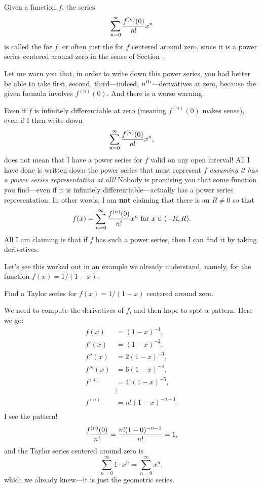 \begin{definition}\label{defn:maclaurin-series}
Given a function $f$, the series
$$\sum_{n=0}^\infty {f^{(n)}(0)\over n!}x^n$$
is called the  for $f$, or often just the
 for $f$ centered around zero, since it is a
power series centered around zero in the sense of
Section~.
\end{definition}
Let me warn you that, in order to write down this power series, you
had better be able to take first, second, third---indeed,
$n^{\mbox{\scriptsize th}}$---derivatives at zero, because the given formula involves
$f^{(n)}(0)$.  And there is a worse warning.
\begin{warning}
  Even if $f$ is infinitely differentiable at zero (meaning $f^{(n)}(0)$ makes sense), even if I then write down
  $$
  \sum_{n=0}^\infty {f^{(n)}(0)\over n!}x^n,
  $$
  does not mean that I have a power series for $f$ valid on any open
  interval!  All I have done is written down the power series that
  must represent $f$ \textit{assuming it has a power series
    representation at all!}  Nobody is promising you that some
  function you find---even if it is infinitely
  differentiable---actually has a power series representation.  In
  other words, I am \textbf{not} claiming that there is an $R \neq 0$
  so that
  $$
  f(x) = \sum_{n=0}^\infty {f^{(n)}(0)\over n!}x^n \mbox{ for $x \in (-R,R)$}.
  $$
  All I am claiming is that if $f$ has such a power series, then I can
  find it by taking derivatives.
\end{warning}

Let's see this worked out in an example we already understand, namely,
for the function $f(x) = 1/(1-x)$.

\begin{example}\label{example:taylor-series-for-rational-function}
  Find a Taylor series for $f(x)=1/(1-x)$ centered around zero.
\end{example}

\begin{solution}
 We need to compute the derivatives of $f$, and then hope to
  spot a pattern.  Here we go:
\begin{align*}
  f(x)&=(1-x)^{-1}, \\
  f'(x)&=(1-x)^{-2}, \\
  f''(x)&=2(1-x)^{-3}, \\
  f'''(x)&=6(1-x)^{-4}, \\
  f^{(4)}&=4!(1-x)^{-5}, \\
  &\vdots \\
  f^{(n)}&=n!(1-x)^{-n-1}. \\
\end{align*}
I see the pattern!
$${f^{(n)}(0)\over n!}={n!(1-0)^{-n-1}\over n!}=1,$$
and the Taylor series centered around zero is
$$\sum_{n=0}^\infty 1\cdot x^n=\sum_{n=0}^\infty x^n,$$
which we already knew---it is just the geometric series.
\end{solution}

